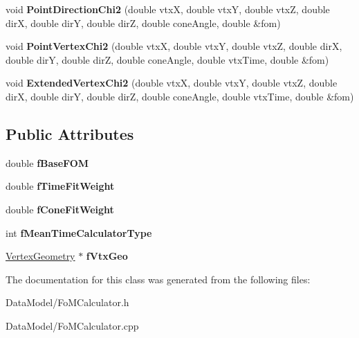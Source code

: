 \begin{DoxyCompactItemize}
\item 
\hypertarget{classFoMCalculator_a275afaff36e1d93e732811382c433566}{
void {\bfseries PointDirectionChi2} (double vtxX, double vtxY, double vtxZ, double dirX, double dirY, double dirZ, double coneAngle, double \&fom)}
\label{classFoMCalculator_a275afaff36e1d93e732811382c433566}

\item 
\hypertarget{classFoMCalculator_a6fc036ee8918755886ffa842e5c5d781}{
void {\bfseries PointVertexChi2} (double vtxX, double vtxY, double vtxZ, double dirX, double dirY, double dirZ, double coneAngle, double vtxTime, double \&fom)}
\label{classFoMCalculator_a6fc036ee8918755886ffa842e5c5d781}

\item 
\hypertarget{classFoMCalculator_a419589ed8639a623dec06684e57d0db5}{
void {\bfseries ExtendedVertexChi2} (double vtxX, double vtxY, double vtxZ, double dirX, double dirY, double dirZ, double coneAngle, double vtxTime, double \&fom)}
\label{classFoMCalculator_a419589ed8639a623dec06684e57d0db5}

\end{DoxyCompactItemize}
\subsection*{Public Attributes}
\begin{DoxyCompactItemize}
\item 
\hypertarget{classFoMCalculator_a3a7bca0306b8b1570e639b863ed7e92e}{
double {\bfseries fBaseFOM}}
\label{classFoMCalculator_a3a7bca0306b8b1570e639b863ed7e92e}

\item 
\hypertarget{classFoMCalculator_ae9c9449bfa160d8c5d241ab3b729a10b}{
double {\bfseries fTimeFitWeight}}
\label{classFoMCalculator_ae9c9449bfa160d8c5d241ab3b729a10b}

\item 
\hypertarget{classFoMCalculator_a74a5ae95c46e77c0d70f346ddf5ac7b4}{
double {\bfseries fConeFitWeight}}
\label{classFoMCalculator_a74a5ae95c46e77c0d70f346ddf5ac7b4}

\item 
\hypertarget{classFoMCalculator_ae80b01958ac5f9513b46406ac46ac486}{
int {\bfseries fMeanTimeCalculatorType}}
\label{classFoMCalculator_ae80b01958ac5f9513b46406ac46ac486}

\item 
\hypertarget{classFoMCalculator_a8962e8746e1e5a857c73c1d3c2b350ee}{
\hyperlink{classVertexGeometry}{VertexGeometry} $\ast$ {\bfseries fVtxGeo}}
\label{classFoMCalculator_a8962e8746e1e5a857c73c1d3c2b350ee}

\end{DoxyCompactItemize}


The documentation for this class was generated from the following files:\begin{DoxyCompactItemize}
\item 
DataModel/FoMCalculator.h\item 
DataModel/FoMCalculator.cpp\end{DoxyCompactItemize}
